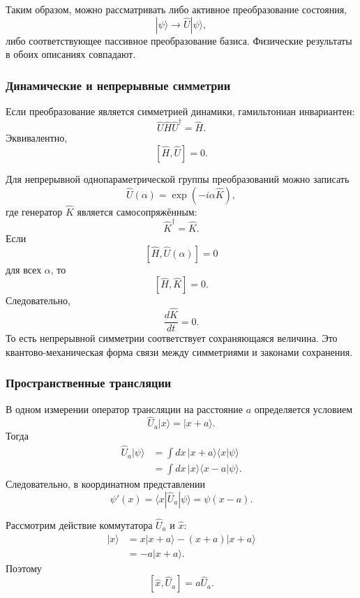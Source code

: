 \documentclass[12pt,a4paper]{article}
\begin{document}
Таким образом, можно рассматривать либо активное преобразование
состояния,
\[
    |\psi\rangle\longrightarrow\hat U|\psi\rangle,
\]
либо соответствующее пассивное преобразование базиса. Физические
результаты в обоих описаниях совпадают.


\subsubsection{Динамические и непрерывные симметрии}

Если преобразование является симметрией динамики, гамильтониан
инвариантен:
\[
    \boxed{
        \hat U\hat H\hat U^\dagger
        =
        \hat H
    }.
\]
Эквивалентно,
\[
    \boxed{
        [\hat H,\hat U]=0
    }.
\]

Для непрерывной однопараметрической группы преобразований можно
записать
\[
    \boxed{
        \hat U(\alpha)
        =
        \exp(-i\alpha\hat K)
    },
\]
где генератор $\hat K$ является самосопряжённым:
\[
    \hat K^\dagger=\hat K.
\]
Если
\[
    [\hat H,\hat U(\alpha)]=0
\]
для всех $\alpha$, то
\[
    \boxed{
        [\hat H,\hat K]=0
    }.
\]
Следовательно,
\[
    \frac{d\hat K}{dt}=0.
\]
То есть непрерывной симметрии соответствует сохраняющаяся величина.
Это квантово-механическая форма связи между симметриями и законами
сохранения.


\subsubsection{Пространственные трансляции}

В одном измерении оператор трансляции на расстояние $a$ определяется
условием
\[
    \boxed{
        \hat U_a|x\rangle
        =
        |x+a\rangle
    }.
\]
Тогда
\begin{align*}
    \hat U_a|\psi\rangle
    &=
    \int dx\,
        |x+a\rangle
        \langle x|\psi\rangle
    \\
    &=
    \int dx\,
        |x\rangle
        \langle x-a|\psi\rangle.
\end{align*}
Следовательно, в координатном представлении
\[
    \boxed{
        \psi'(x)
        =
        \langle x|\hat U_a|\psi\rangle
        =
        \psi(x-a)
    }.
\]

Рассмотрим действие коммутатора $\hat U_a$ и $\hat x$:
\begin{align*}
    [\hat U_a,\hat x]|x\rangle
    &=
    x|x+a\rangle
    -
    (x+a)|x+a\rangle
    \\
    &=
    -a|x+a\rangle.
\end{align*}
Поэтому
\[
    \boxed{
        [\hat x,\hat U_a]
        =
        a\hat U_a
    }.
\]
\end{document}
